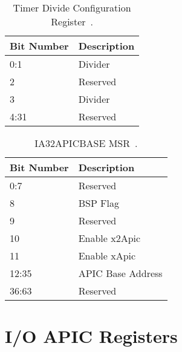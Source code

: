 \begin{table}[H]
  \centering
  \begin{tabularx}{1.0\textwidth}{| X | X |}
    \hline
    \textbf{Bit Number} & \textbf{Description} \\ \hline\hline
    0:1                 & Divider              \\ \hline
    2                   & Reserved             \\ \hline
    3                   & Divider              \\ \hline
    4:31                & Reserved             \\ \hline
  \end{tabularx}
  \caption{Timer Divide Configuration Register~\cite[sec.~3.11.5.4]{ia32}.}
  \label{tab:lapicregstimerdiv}
\end{table}

\begin{table}[H]
  \centering
  \begin{tabularx}{1.0\textwidth}{| X | X |}
    \hline
    \textbf{Bit Number} & \textbf{Description} \\ \hline\hline
    0:7                 & Reserved             \\ \hline
    8                   & BSP Flag             \\ \hline
    9                   & Reserved             \\ \hline
    10                  & Enable x2Apic        \\ \hline
    11                  & Enable xApic         \\ \hline
    12:35               & APIC Base Address    \\ \hline
    36:63               & Reserved             \\ \hline
  \end{tabularx}
  \caption{IA32\textunderscore{}APIC\textunderscore{}BASE MSR~\cite[sec.~3.11.12.1]{ia32}.}
  \label{tab:lapicregsmsr}
\end{table}

\clearpage

\section{I/O APIC Registers}
\label{sec:ioapicregs}

